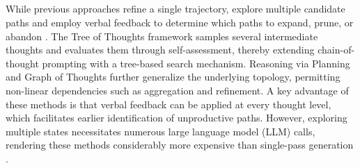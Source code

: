 \subsection{\texorpdfstring{}{Evaluator Feedback in Search}}%
\label{sec:search-guided}
 While previous approaches refine a single trajectory,  explore multiple candidate paths and employ verbal feedback to determine which paths to expand, prune, or abandon \citep{wang-etal-2025-dont}. The Tree of Thoughts framework \citep{yao2023tree} samples several intermediate thoughts and evaluates them through self-assessment, thereby extending chain-of-thought prompting \citep{wei2022chain} with a tree-based search mechanism. Reasoning via Planning \citep{hao2023reasoning} and Graph of Thoughts \citep{besta2024graph} further generalize the underlying topology, permitting non-linear dependencies such as aggregation and refinement. A key advantage of these methods is that verbal feedback can be applied at every thought level, which facilitates earlier identification of unproductive paths. However, exploring multiple states necessitates numerous large language model (LLM) calls, rendering these methods considerably more expensive than single-pass generation \citep{xie2023self}.




